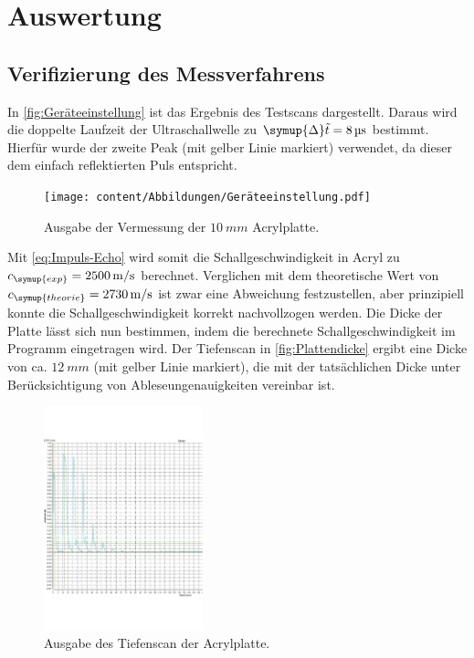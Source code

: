 \section{Auswertung}
\label{sec:Auswertung}

\subsection{Verifizierung des Messverfahrens}
\label{sec:Verifizierung des Messverfahrens}
In \autoref{fig:Geräteeinstellung} ist das Ergebnis des Testscans dargestellt. Daraus wird die doppelte Laufzeit der
Ultraschallwelle zu $\symup{\Delta}\tilde{t}=\qty{8}{\micro\second}$ bestimmt.
Hierfür wurde der zweite Peak (mit gelber Linie markiert) verwendet, da dieser dem einfach reflektierten Puls entspricht.

\begin{figure}[H]
  \centering
  \texttt{[image: content/Abbildungen/Geräteeinstellung.pdf]}
  \caption{Ausgabe der Vermessung der $\qty{10}{mm}$ Acrylplatte.}
  \label{fig:Geräteeinstellung}
\end{figure}

Mit \eqref{eq:Impuls-Echo} wird somit die Schallgeschwindigkeit in Acryl zu $c_{\symup{exp}}=\qty{2500}{\metre\per\second}$ berechnet.
Verglichen mit dem theoretische Wert von $c_{\symup{theorie}}=\qty{2730}{\metre\per\second}$ ist zwar eine Abweichung festzustellen,
aber prinzipiell konnte die Schallgeschwindigkeit korrekt nachvollzogen werden.
Die Dicke der Platte lässt sich nun bestimmen, indem die berechnete Schallgeschwindigkeit im Programm eingetragen wird.
Der Tiefenscan in \autoref{fig:Plattendicke} ergibt eine Dicke von ca. $\qty{12}{mm}$ (mit gelber Linie markiert), die mit der tatsächlichen
Dicke unter Berücksichtigung von Ableseungenauigkeiten vereinbar ist.

\begin{figure}[H]
  \centering
  \includegraphics[height=6.5cm]{content/Abbildungen/Plattendicke.pdf}
  \caption{Ausgabe des Tiefenscan der Acrylplatte.}
  \label{fig:Plattendicke}
\end{figure}


